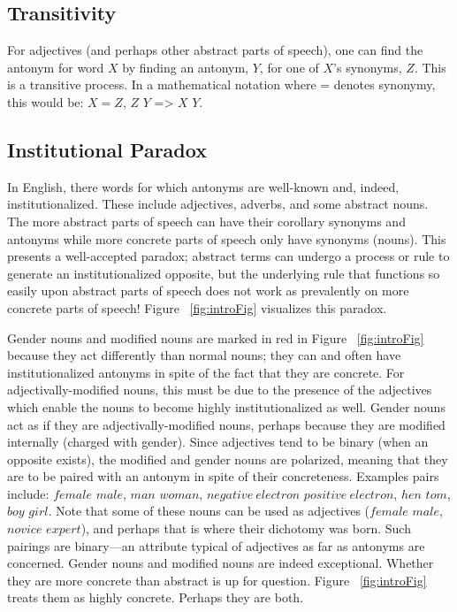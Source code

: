 \subsection {Transitivity} For adjectives (and perhaps other abstract parts of speech), one can find the antonym for word $X$ by finding an antonym, $Y$, for one of $X$’s synonyms, $Z$.  This is a transitive process.  In a mathematical notation where = denotes synonymy, this would be: $X = Z$, $Z$ \opp $Y$ => $X$ \opp $Y$.

\subsection {Institutional Paradox} In English, there words for which antonyms are well-known and, indeed, institutionalized.  These include adjectives, adverbs, and some abstract nouns.  The more abstract parts of speech can have their corollary synonyms and antonyms while more concrete parts of speech only have synonyms (nouns). This presents a well-accepted paradox; abstract terms can undergo a process or rule to generate an institutionalized opposite, but the underlying rule that functions so easily upon abstract parts of speech does not work as prevalently on more concrete parts of speech!  Figure ~\ref{fig:introFig} visualizes this paradox.

Gender nouns and modified nouns are marked in red in Figure ~\ref{fig:introFig} because they act differently than normal nouns; they can and often have institutionalized antonyms in spite of the fact that they are concrete.  For adjectivally-modified nouns, this must be due to the presence of the adjectives which enable the nouns to become highly institutionalized as well.  Gender nouns act as if they are adjectivally-modified nouns, perhaps because they are modified internally (charged with gender).  Since adjectives tend to be binary (when an opposite exists), the modified and gender nouns are polarized, meaning that they are to be paired with an antonym in spite of their concreteness.  Examples pairs include: $female$ \opp $male$, $man$ \opp $woman$, $negative~electron$ \opp $positive~electron$, $hen$ \opp $tom$, $boy$ \opp $girl$.  Note that some of these nouns can be used as adjectives ($female$ \opp $male$, $novice$ \opp $expert$), and perhaps that is where their dichotomy was born.  Such pairings are binary---an attribute typical of adjectives as far as antonyms are concerned.  Gender nouns and modified nouns are indeed exceptional.  Whether they are more concrete than abstract is up for question.  Figure ~\ref{fig:introFig} treats them as highly concrete.  Perhaps they are both.    

